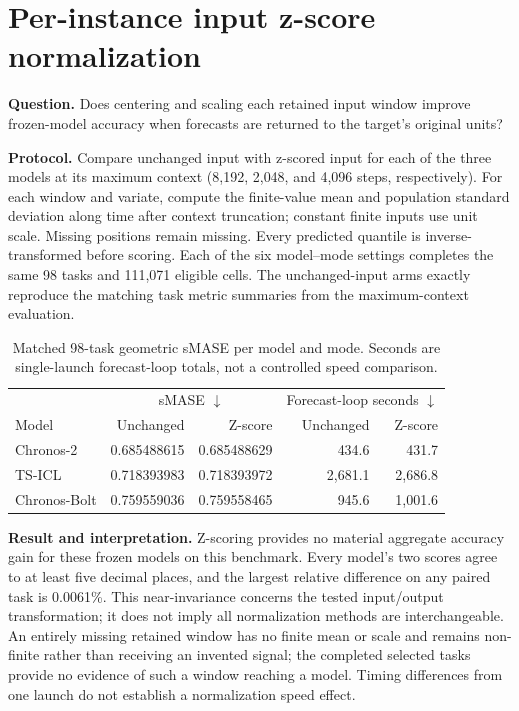 \documentclass[11pt,a4paper]{article}
\begin{document}
\clearpage
\section{Per-instance input z-score normalization}
\textbf{Question.} Does centering and scaling each retained input window
improve frozen-model accuracy when forecasts are returned to the target's
original units?

\textbf{Protocol.} Compare unchanged input with z-scored input for each of
the three models at its maximum context (8,192, 2,048, and 4,096 steps,
respectively). For each window and variate, compute the finite-value mean
and population standard deviation along time after context truncation;
constant finite inputs use unit scale. Missing positions remain missing.
Every predicted quantile is inverse-transformed before scoring. Each of the
six model--mode settings completes the same 98 tasks and 111,071 eligible
cells. The unchanged-input arms exactly reproduce the matching task metric
summaries from the maximum-context evaluation.

\begin{table}[h]
\centering\small
\begin{tabular}{@{}lrrrr@{}}
\toprule
 & \multicolumn{2}{c}{sMASE $\downarrow$} & \multicolumn{2}{c}{Forecast-loop seconds $\downarrow$}\\
Model & Unchanged & Z-score & Unchanged & Z-score\\
\midrule
Chronos-2 & 0.685488615 & 0.685488629 & 434.6 & 431.7\\
TS-ICL & 0.718393983 & 0.718393972 & 2,681.1 & 2,686.8\\
Chronos-Bolt & 0.759559036 & 0.759558465 & 945.6 & 1,001.6\\
\bottomrule
\end{tabular}
\caption{Matched 98-task geometric sMASE per model and mode. Seconds are
single-launch forecast-loop totals, not a controlled speed comparison.}
\end{table}

\textbf{Result and interpretation.} Z-scoring provides no material aggregate
accuracy gain for these frozen models on this benchmark. Every model's two
scores agree to at least five decimal places, and the largest relative
difference on any paired task is 0.0061\%. This near-invariance concerns the
tested input/output transformation; it does not imply all normalization
methods are interchangeable. An entirely missing retained window has no
finite mean or scale and remains non-finite rather than receiving an invented
signal; the completed selected tasks provide no evidence of such a window
reaching a model. Timing differences from one launch do not establish a
normalization speed effect.
\end{document}
